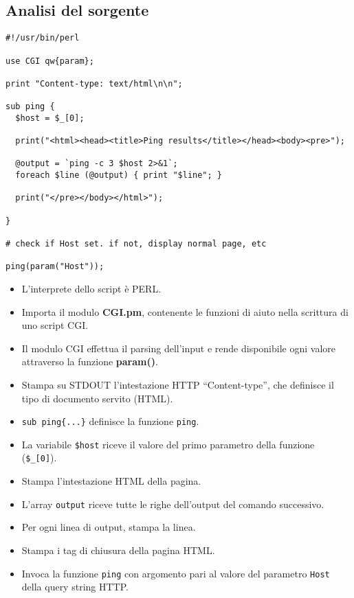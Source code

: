 \subsection{Analisi del sorgente}
\begin{lstlisting}[style=perlstyle]
#!/usr/bin/perl

use CGI qw{param};

print "Content-type: text/html\n\n";

sub ping {
  $host = $_[0];

  print("<html><head><title>Ping results</title></head><body><pre>");

  @output = `ping -c 3 $host 2>&1`;
  foreach $line (@output) { print "$line"; }

  print("</pre></body></html>");
  
}

# check if Host set. if not, display normal page, etc

ping(param("Host"));
\end{lstlisting}
\begin{itemize}
    \item L'interprete dello script è PERL.
    \item Importa il modulo \textbf{CGI.pm}, contenente le funzioni di aiuto nella scrittura di uno script CGI.
    \item Il modulo CGI effettua il parsing dell'input e rende disponibile ogni valore attraverso la funzione \textbf{param()}.
    \item Stampa su STDOUT l'intestazione HTTP “Content-type”, che definisce il tipo di documento servito (HTML).
    \item \texttt{sub ping\{...\}} definisce la funzione \texttt{ping}.
    \item La variabile \texttt{\$host} riceve il valore del primo parametro della funzione (\texttt{\$\_[0]}).
    \item Stampa l'intestazione HTML della pagina.
    \item L'array \texttt{output} riceve tutte le righe dell'output del comando successivo.
    \item Per ogni linea di output, stampa la linea.
    \item Stampa i tag di chiusura della pagina HTML.
    \item Invoca la funzione \texttt{ping} con argomento pari al valore del parametro \texttt{Host} della query string HTTP.
\end{itemize}

